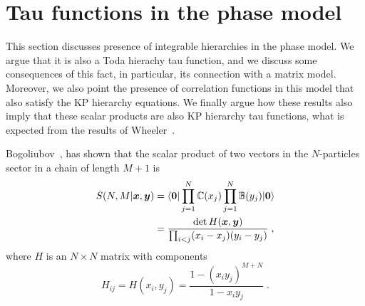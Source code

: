 \documentclass[a4paper,11pt]{amsart}
\begin{document}

\section{Tau functions in the phase model}

This section discusses presence of integrable hierarchies in the phase
model.  We argue that it is also a Toda hierachy tau function, and we
discuss some consequences of this fact, in particular, its connection
with a matrix model. Moreover, we also point the presence of
correlation functions in this model that also satisfy the KP hierarchy
equations. We finally argue how these results also imply that these
scalar products are also KP hierarchy tau functions, what is expected from 
the results of Wheeler~\cite{Wheeler:2010vmq}.

Bogoliubov~\cite{Bogoliubov2005}, has shown that the scalar product of
two vectors in the \(N\)-particles sector in a chain of length \(M+1\)
is
\begin{equation}
\begin{split}
\label{eq:scalar}
  S(N, M|\bm{x}, \bm{y}) & =
  \langle\bm{0}\rvert \prod_{j=1}^N \mathbb{C}(x_j) \prod_{j=1}^N \mathbb{B}(y_j) \lvert\bm{0}\rangle \\ 
 & = \frac{ \det H(\bm{x},\bm{y})}{ \prod_{i<j}(x_i - x_j)(y_i - y_j)} \; ,
\end{split}
\end{equation}
where \(H\) is an \(N\times N\) matrix with components
\begin{equation}
\label{eq:h-matrix}
  H_{ij} = H(x_i, y_j) 
  =\frac{1 - (x_i y_j)^{ M + N}}{1 - x_i y_j }\; .
\end{equation}

\end{document}

